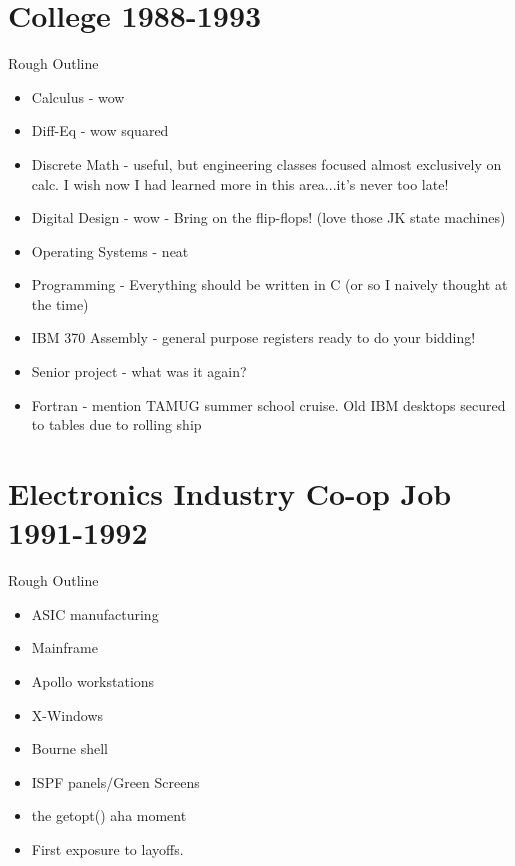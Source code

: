 \section{College 1988-1993}
	Rough Outline
	\begin{itemize}
	\item Calculus - wow
	\item Diff-Eq - wow squared
	\item Discrete Math - useful, but engineering classes focused almost exclusively on calc. I wish now I had 
	learned more in this area...it's never too late!
	\item Digital Design - wow - Bring on the flip-flops! (love those JK state machines)
	\item Operating Systems - neat
	\item Programming - Everything should be written in C (or so I naively thought at the time)
	\item IBM 370 Assembly - general purpose registers ready to do your bidding!
	\item Senior project - what was it again?
	\item Fortran - mention TAMUG summer school cruise. Old IBM desktops secured to tables due to rolling ship
	\end{itemize}

\section{Electronics Industry Co-op Job 1991-1992}
	Rough Outline
	\begin{itemize}
	\item ASIC manufacturing
	\item Mainframe
	\item Apollo workstations
	\item X-Windows
	\item Bourne shell
        \item ISPF panels/Green Screens
	\item the getopt() aha moment
        \item First exposure to layoffs.
        
	\end{itemize}
